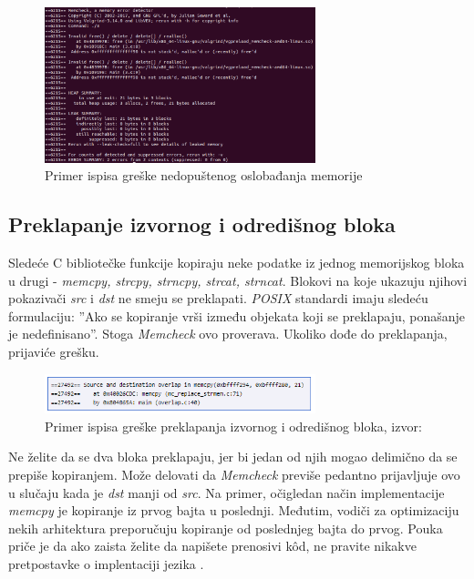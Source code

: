 \documentclass[12pt,oneside]{memoir}
\theoremstyle{plain}
\theoremstyle{definition}
\begin{document}
\begin{figure}[!ht]
  \centering
  \includegraphics[width=0.7\textwidth]{invalidFreeError.png}
  \caption{Primer ispisa greške nedopuštenog oslobađanja memorije}
  \label{fig:slika2.9}
\end{figure}

\subsection{Preklapanje izvornog i odredišnog bloka}
Sledeće C bibliotečke funkcije kopiraju neke podatke iz jednog memorijskog bloka u drugi - \textit{memcpy, strcpy, strncpy, strcat, strncat}.  Blokovi na koje ukazuju njihovi pokazivači \textit{src} i \textit{dst} ne smeju se preklapati. \textit{POSIX} standardi imaju sledeću formulaciju: ''Ako se kopiranje vrši između objekata koji se preklapaju, ponašanje je nedefinisano''.  Stoga \textit{Memcheck} ovo proverava. Ukoliko dođe do preklapanja, prijaviće grešku.
\begin{figure}[!ht]
  \centering
  \includegraphics[width=0.7\textwidth]{overlapError.png}
  \caption{Primer ispisa greške preklapanja izvornog i odredišnog bloka, izvor: \cite{Memcheck}}
  \label{fig:slika2.10}
\end{figure}
Ne želite da se dva bloka preklapaju, jer bi jedan od njih mogao delimično da se prepiše kopiranjem. Može delovati da \textit{Memcheck} previše pedantno prijavljuje ovo u slučaju kada je \textit{dst} manji od \textit{src}. Na primer, očigledan način implementacije \textit{memcpy}  je kopiranje iz prvog bajta u poslednji. Međutim, vodiči za optimizaciju nekih arhitektura preporučuju kopiranje od poslednjeg bajta do prvog. Pouka priče je da ako zaista želite da napišete prenosivi k\^od, ne pravite nikakve pretpostavke o implentaciji jezika \cite{Memcheck}. 
\end{document}

